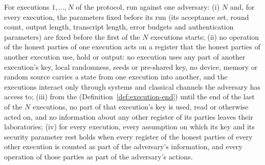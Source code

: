 \begin{assumption}\label{ass:separate-executions}
For executions $1,\dots,N$ of the protocol, run against one adversary:
(i) $N$ and, for every execution, the parameters fixed before its run (its
acceptance set, round count, output length, transcript length, error
budgets and authentication parameters) are fixed before the first of the
$N$ executions starts;
(ii) no operation of the honest parties of one execution acts on a register
that the honest parties of another execution use, hold or output: no
execution uses any part of another execution's key, local randomness,
seeds or pre-shared key, no device, memory or random source carries a
state from one execution into another, and the executions interact only
through systems and classical channels the adversary has access to;
(iii) from the 
(Definition~\ref{def:execution-end}) until the end of the last of the $N$
executions, no part of that execution's key is used, read or otherwise
acted on, and no information about any other register of its parties
leaves their laboratories;
(iv) for every execution, every assumption on which its key and its
security parameter rest holds when every register of the honest parties of
every other execution is counted as part of the adversary's information,
and every operation of those parties as part of the adversary's actions.
\end{assumption}

